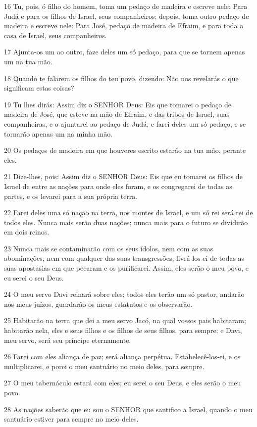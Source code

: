 \par 16 Tu, pois, ó filho do homem, toma um pedaço de madeira e escreve nele: Para Judá e para os filhos de Israel, seus companheiros; depois, toma outro pedaço de madeira e escreve nele: Para José, pedaço de madeira de Efraim, e para toda a casa de Israel, seus companheiros.
\par 17 Ajunta-os um ao outro, faze deles um só pedaço, para que se tornem apenas um na tua mão.
\par 18 Quando te falarem os filhos do teu povo, dizendo: Não nos revelarás o que significam estas coisas?
\par 19 Tu lhes dirás: Assim diz o SENHOR Deus: Eis que tomarei o pedaço de madeira de José, que esteve na mão de Efraim, e das tribos de Israel, suas companheiras, e o ajuntarei ao pedaço de Judá, e farei deles um só pedaço, e se tornarão apenas um na minha mão.
\par 20 Os pedaços de madeira em que houveres escrito estarão na tua mão, perante eles.
\par 21 Dize-lhes, pois: Assim diz o SENHOR Deus: Eis que eu tomarei os filhos de Israel de entre as nações para onde eles foram, e os congregarei de todas as partes, e os levarei para a sua própria terra.
\par 22 Farei deles uma só nação na terra, nos montes de Israel, e um só rei será rei de todos eles. Nunca mais serão duas nações; nunca mais para o futuro se dividirão em dois reinos.
\par 23 Nunca mais se contaminarão com os seus ídolos, nem com as suas abominações, nem com qualquer das suas transgressões; livrá-los-ei de todas as suas apostasias em que pecaram e os purificarei. Assim, eles serão o meu povo, e eu serei o seu Deus.
\par 24 O meu servo Davi reinará sobre eles; todos eles terão um só pastor, andarão nos meus juízos, guardarão os meus estatutos e os observarão.
\par 25 Habitarão na terra que dei a meu servo Jacó, na qual vossos pais habitaram; habitarão nela, eles e seus filhos e os filhos de seus filhos, para sempre; e Davi, meu servo, será seu príncipe eternamente.
\par 26 Farei com eles aliança de paz; será aliança perpétua. Estabelecê-los-ei, e os multiplicarei, e porei o meu santuário no meio deles, para sempre.
\par 27 O meu tabernáculo estará com eles; eu serei o seu Deus, e eles serão o meu povo.
\par 28 As nações saberão que eu sou o SENHOR que santifico a Israel, quando o meu santuário estiver para sempre no meio deles.

